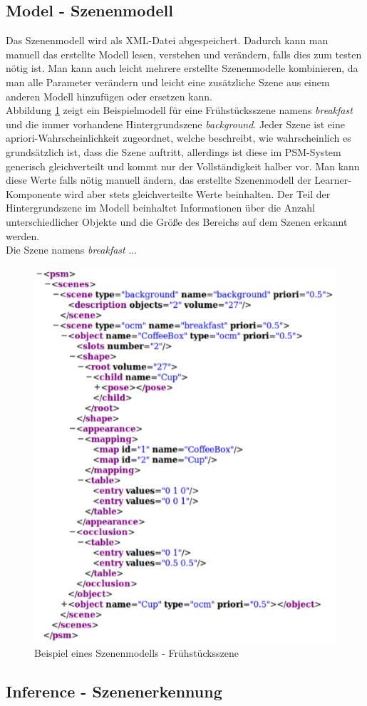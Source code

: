 \subsection{Model - Szenenmodell}
Das Szenenmodell wird als XML-Datei abgespeichert. Dadurch kann man manuell das erstellte Modell lesen, verstehen und verändern, falls dies zum testen nötig ist. Man kann auch leicht mehrere erstellte Szenenmodelle kombinieren, da man alle Parameter verändern und leicht eine zusätzliche Szene aus einem anderen Modell hinzufügen oder ersetzen kann. \smallskip\\ 
Abbildung \ref{img:modelexample} zeigt ein Beispielmodell für eine Frühstücksszene namens \textit{breakfast} und die immer vorhandene Hintergrundszene \textit{background}. Jeder Szene ist eine apriori-Wahrscheinlichkeit zugeordnet, welche beschreibt, wie wahrscheinlich es grundsätzlich ist, dass die Szene auftritt, allerdings ist diese im PSM-System generisch gleichverteilt und kommt nur der Vollständigkeit halber vor. Man kann diese Werte falls nötig manuell ändern, das erstellte Szenenmodell der Learner-Komponente wird aber stets gleichverteilte Werte beinhalten. Der Teil der Hintergrundszene im Modell beinhaltet Informationen über die Anzahl unterschiedlicher Objekte und die Größe des Bereichs auf dem Szenen erkannt werden.\smallskip\\
Die Szene namens \textit{breakfast} ...
\begin{deprecated}
\cite{gehrung14}
\end{deprecated}
\begin{figure}
	\centering
	\includegraphics[width=15cm]{bilder/Modell.pdf}
	\caption{Beispiel eines Szenenmodells - Frühstücksszene}
	\label{img:modelexample}
\end{figure}
\subsection{Inference - Szenenerkennung}


\begin{deprecated}
\cite{gehrung14}
\end{deprecated}
